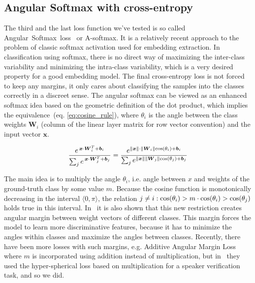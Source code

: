 \subsection*{Angular Softmax with cross-entropy}

The third and the last loss function we've tested is so called Angular~Softmax~loss~\cite{A_softmax_original} or A-softmax. It is a relatively recent approach to the problem of classic softmax activation used for embedding extraction. In classification using softmax, there is no direct way of maximizing the inter-class variability and minimizing the intra-class variability, which is a very desired property for a good embedding model. The final cross-entropy loss is not forced to keep any margins, it only cares about classifying the samples into the classes correctly in a discreet sense. The angular softmax can be viewed as an enhanced softmax idea based on the geometric definition of the dot product, which implies the equivalence~(eq. \ref{eq:cosine_rule}), where $ \theta_i $ is the angle between the class weights $ \boldsymbol{W}_i $ (column of the linear layer matrix for row vector convention) and the input vector $ \boldsymbol{x} $.

\begin{equation} \label{eq:cosine_rule}
\frac{e^{\,\boldsymbol{x} \cdot \boldsymbol{W}_i^T + \boldsymbol{b}_i}}
{\sum_{j} e^{\,\boldsymbol{x} \cdot \boldsymbol{W}_j^T + \boldsymbol{b}_j}} =
\frac{e^{\lVert\boldsymbol{x}\rVert \cdot \lVert\boldsymbol{W}_i\rVert \textnormal{cos}(\theta_i)  + \boldsymbol{b}_i}}
{\sum_{j} e^{\lVert\boldsymbol{x}\rVert \lVert\boldsymbol{W}_j\rVert \textnormal{cos}(\theta_j)  + \boldsymbol{b}_j}}
\end{equation}

\medskip
\noindent
The main idea is to multiply the angle $ \theta_i $, i.e. angle between $ x $ and weights of the ground-truth class by some value $ m $. Because the cosine function is monotonically decreasing in the interval $ \langle 0, \pi \rangle $, the relation $ j \neq i : \textnormal{cos}(\theta_i) > m \cdot \textnormal{cos}(\theta_i) > \textnormal{cos}(\theta_j) $ holds true in this interval. In~\cite{A_softmax_original} it is also shown that this new restriction creates angular margin between weight vectors of different classes. This margin forces the model to learn more discriminative features, because it has to minimize the angles within classes and maximize the angles between classes. Recently, there have been more losses with such margins, e.g. Additive Angular Margin Loss \cite{arc_face} where $ m $ is incorporated using addition instead of multiplication, but in~\cite{A_softmax} they used the hyper-spherical loss based on multiplication for a speaker verification task, and so we did.

